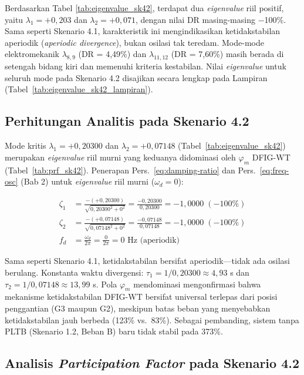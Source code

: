 Berdasarkan Tabel \ref{tab:eigenvalue_sk42}, terdapat dua \textit{eigenvalue}
riil positif, yaitu $\lambda_1 = +0{,}203$ dan $\lambda_2 = +0{,}071$, dengan
nilai DR masing-masing $-$100\%. Sama seperti Skenario 4.1, karakteristik ini
mengindikasikan ketidakstabilan aperiodik (\textit{aperiodic divergence}),
bukan osilasi tak teredam. Mode-mode elektromekanik $\lambda_{8,9}$ (DR =
4,49\%) dan $\lambda_{11,12}$ (DR = 7,60\%) masih berada di setengah bidang
kiri dan memenuhi kriteria kestabilan. Nilai \textit{eigenvalue} untuk seluruh
mode pada Skenario 4.2 disajikan secara lengkap pada Lampiran
(Tabel~\ref{tab:eigenvalue_sk42_lampiran}).

\subsection{Perhitungan Analitis pada Skenario 4.2}

Mode kritis $\lambda_1 = +0{,}20300$ dan $\lambda_2 = +0{,}07148$
(Tabel~\ref{tab:eigenvalue_sk42}) merupakan \textit{eigenvalue} riil murni yang
keduanya didominasi oleh $\varphi_m$ DFIG-WT (Tabel~\ref{tab:prf_sk42}).
Penerapan Pers.~\ref{eq:damping-ratio} dan Pers.~\ref{eq:freq-osc} (Bab 2)
untuk \textit{eigenvalue} riil murni ($\omega_d = 0$):

\begin{align}
    \zeta_1 &= \frac{-(+0{,}20300)}{\sqrt{0{,}20300^2 + 0^2}}
             = \frac{-0{,}20300}{0{,}20300} = -1{,}0000 \;(-100\%) \\
    \zeta_2 &= \frac{-(+0{,}07148)}{\sqrt{0{,}07148^2 + 0^2}}
             = \frac{-0{,}07148}{0{,}07148} = -1{,}0000 \;(-100\%) \\
    f_{d}   &= \frac{\omega_d}{2\pi} = \frac{0}{2\pi} = 0 \text{ Hz (aperiodik)}
\end{align}

Sama seperti Skenario 4.1, ketidakstabilan bersifat aperiodik---tidak ada osilasi
berulang. Konstanta waktu divergensi: $\tau_1 = 1/0{,}20300 \approx 4{,}93$ s dan
$\tau_2 = 1/0{,}07148 \approx 13{,}99$ s. Pola $\varphi_m$ mendominasi
mengonfirmasi bahwa mekanisme ketidakstabilan DFIG-WT bersifat universal terlepas
dari posisi penggantian (G3 maupun G2), meskipun batas beban yang menyebabkan
ketidakstabilan jauh berbeda (123\% vs.\ 83\%). Sebagai pembanding, sistem tanpa
PLTB (Skenario 1.2, Beban B) baru tidak stabil pada 373\%.

\subsection{Analisis \textit{Participation Factor} pada Skenario 4.2}

